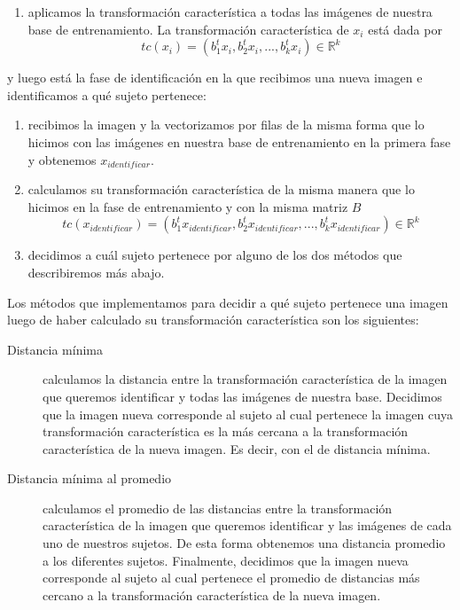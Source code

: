 \begin{enumerate}
 \item aplicamos la transformación característica a todas las imágenes de nuestra base de entrenamiento. La transformación característica
 de $x_i$ está dada por \begin{displaymath}
			    tc(x_i) = ({b_1^t}x_i, {b_2^t}x_i,..., {b_k^t}x_i)\in\mathbb{R}^k
                        \end{displaymath}

\end{enumerate}

y luego está la fase de identificación en la que recibimos una nueva imagen e identificamos a qué sujeto pertenece:
\begin{enumerate}
 \item recibimos la imagen y la vectorizamos por filas de la misma forma que lo hicimos con las imágenes en nuestra base de entrenamiento
 en la primera fase y obtenemos $x_{identificar}$.
 
 \item calculamos su transformación característica de la misma manera que lo hicimos en la fase de entrenamiento y con la misma matriz $B$
  \begin{displaymath}
			    tc(x_{identificar}) = ({b_1^t}x_{identificar}, {b_2^t}x_{identificar},..., {b_k^t}x_{identificar})\in\mathbb{R}^k
  \end{displaymath}
 
 \item decidimos a cuál sujeto pertenece por alguno de los dos métodos que describiremos más abajo.

\end{enumerate}
Los métodos que implementamos para decidir a qué sujeto pertenece una imagen luego de haber calculado su transformación
característica son los siguientes:
\begin{description}
  \item[Distancia mínima] calculamos la distancia entre la transformación característica de la imagen que queremos identificar
  y todas las imágenes de nuestra base. Decidimos que la imagen nueva corresponde al sujeto al cual pertenece la imagen cuya transformación
  característica es la más cercana a la transformación característica de la nueva imagen. Es decir, con el de distancia mínima.
  \item[Distancia mínima al promedio] calculamos el promedio de las distancias entre la transformación característica de la imagen que 
  queremos identificar y las imágenes de cada uno de nuestros sujetos. De esta forma obtenemos una distancia promedio a los diferentes sujetos.
  Finalmente, decidimos que la imagen nueva corresponde al sujeto al cual pertenece el promedio de distancias más cercano 
  a la transformación característica de la nueva imagen.
\end{description}

